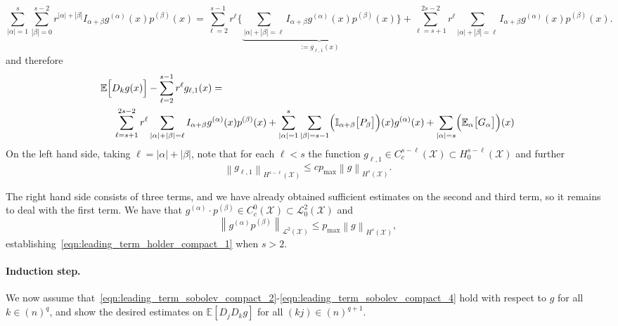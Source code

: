 \documentclass{article}
\newcommand{\abs}[1]{\left \lvert #1 \right \rvert}
\newcommand{\norm}[1]{\left \lVert #1 \right \rVert}
\newcommand{\1}{\mathbf{1}}
\newcommand{\Xset}{\mathcal{X}}
\newcommand{\Leb}{\mathcal{L}}
\newcommand{\Ebb}{\mathbb{E}}
\newcommand{\Ibb}{\mathbb{I}}
\theoremstyle{alden}
\theoremstyle{aldenthm}
\theoremstyle{definition}
\theoremstyle{remark}
\begin{document}
\begin{equation*}
\sum_{\abs{\alpha} = 1}^{s} \sum_{\abs{\beta} = 0}^{s - 2} r^{\abs{\alpha} + \abs{\beta}} I_{\alpha + \beta} g^{(\alpha)}(x) p^{(\beta)}(x) = \sum_{\ell = 2}^{s - 1} r^{\ell} \Biggl\{\underbrace{\sum_{\abs{\alpha} + \abs{\beta} = \ell} I_{\alpha + \beta} g^{(\alpha)}(x) p^{(\beta)}(x)}_{:=g_{\ell,1}(x)}\Biggr\} + \sum_{\ell = s + 1}^{2s - 2} r^{\ell} \sum_{\abs{\alpha} + \abs{\beta} = \ell} I_{\alpha + \beta} g^{(\alpha)}(x) p^{(\beta)}(x).
\end{equation*}
and therefore
\begin{align*}
& \Ebb\Bigl[D_kg(x)\Bigr] - \sum_{\ell = 2}^{s - 1} r^{\ell} g_{\ell,1}(x) = \\ & ~~~~ \sum_{\ell = s + 1}^{2s - 2} r^{\ell} \sum_{\abs{\alpha} + \abs{\beta} = \ell} I_{\alpha + \beta} g^{(\alpha)}(x) p^{(\beta)}(x) +  \sum_{\abs{\alpha} = 1}^{s} \sum_{\abs{\beta} = s - 1} \Bigl(\Ibb_{\alpha + \beta}\bigl[P_{\beta}\bigr]\Bigr)(x) g^{(\alpha)}(x) + \sum_{\abs{\alpha} = s} \Bigl(\Ebb_{\alpha}\bigl[G_{\alpha}\bigr]\Bigr)(x)
\end{align*}
On the left hand side, taking $\ell = \abs{\alpha} + \abs{\beta}$, note that for each $\ell < s$ the function $g_{\ell,1} \in C_c^{s - \ell}(\Xset) \subset H_0^{s - \ell}(\Xset)$ and further
\begin{equation}
\label{eqn:leading_term_sobolev_compact_pf3}
\norm{g_{\ell,1}}_{H^{s - \ell}(\Xset)} \leq c p_{\max} \norm{g}_{H^s(\Xset)}.
\end{equation}

The right hand side consists of three terms, and we have already obtained sufficient estimates on the second and third term, so it remains to deal with the first term. We have that $g^{(\alpha)}\cdot p^{(\beta)} \in C_c^{0}(\Xset) \subset \Leb_0^2(\Xset)$ and
\begin{equation}
\label{eqn:leading_term_sobolev_compact_pf4}
\norm{g^{(\alpha)}p^{(\beta)}}_{\Leb^2(\Xset)} \leq p_{\max} \norm{g}_{H^s(\Xset)},
\end{equation}
establishing~\eqref{eqn:leading_term_holder_compact_1} when $s > 2$.

\paragraph{Induction step.}
We now assume that~\eqref{eqn:leading_term_sobolev_compact_2}-\eqref{eqn:leading_term_sobolev_compact_4} hold with respect to $g$ for all $k \in (n)^q$, and show the desired estimates on $\Ebb[D_jD_kg]$ for all $(kj) \in (n)^{q + 1}$.
\end{document}

